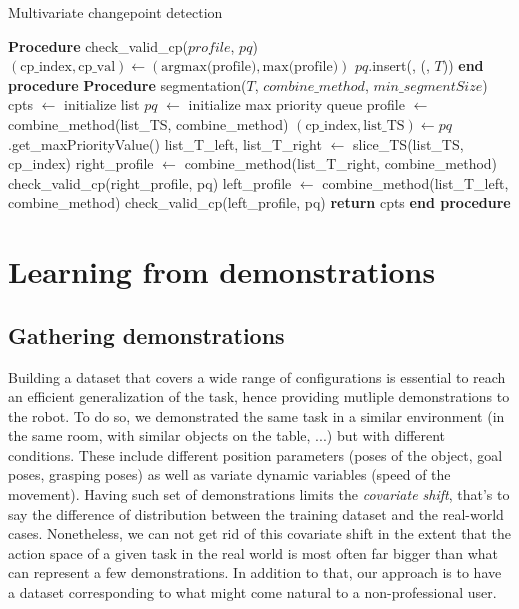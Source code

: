 \documentclass[conference]{IEEEtran}
\begin{document}
\begin{algorithm}
 \caption{Multivariate changepoint detection}
\begin{algorithmic}[1]
    \STATE \textbf{Procedure} check\_valid\_cp($profile$, $pq$)
    \STATE $(\text{cp\_index}, \text{cp\_val}) \leftarrow (\text{argmax(profile)}, \text{max(profile)})$
        \STATE $pq$.insert(, (, $T$))
    \ENDIF
    \STATE \textbf{end procedure}
    \STATE
    \STATE \textbf{Procedure} segmentation($T$, $combine\_method$, $min\_segmentSize$)
    \STATE cpts $\leftarrow$ initialize list
    \STATE $pq$ $\leftarrow$ initialize max priority queue
    \STATE profile $\leftarrow$ combine\_method(list\_TS, combine\_method)
        \STATE $(\text{cp\_index}, \text{list\_TS}) \leftarrow pq$.get\_maxPriorityValue()
        \STATE list\_T\_left, list\_T\_right $\leftarrow$ slice\_TS(list\_TS, cp\_index)
            \STATE right\_profile $\leftarrow$ combine\_method(list\_T\_right, combine\_method)
            \STATE check\_valid\_cp(right\_profile, pq)
        \ENDIF
            \STATE left\_profile $\leftarrow$ combine\_method(list\_T\_left, combine\_method)
            \STATE check\_valid\_cp(left\_profile, pq)
        \ENDIF
        \STATE
    \ENDWHILE
    \STATE \textbf{return} cpts
    \STATE \textbf{end procedure}
\end{algorithmic}
 \label{alg:CPD}
\end{algorithm}

\section{Learning from demonstrations}

\subsection{Gathering demonstrations}


Building a dataset that covers a wide range of configurations is essential to reach an efficient generalization of the task, hence providing mutliple demonstrations to the robot. To do so, we demonstrated the same task in a similar environment (in the same room, with similar objects on the table, ...) but with different conditions. These include different position parameters (poses of the object, goal poses, grasping poses) as well as variate dynamic variables (speed of the movement). Having such set of demonstrations limits the \textit{covariate  shift}, that's to say the difference of distribution between the training dataset and the real-world cases. Nonetheless, we can not get rid of  this covariate shift in the extent that the action space of a given task in the real world is most often far bigger than what can represent a few demonstrations. In addition to that, our approach is to have a dataset corresponding to what might come natural to a non-professional user.
\end{document}

